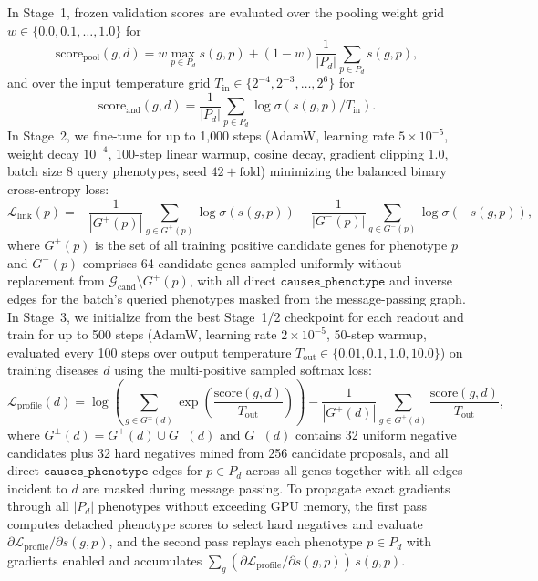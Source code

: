 \documentclass{article}
\begin{document}
In Stage~1, frozen validation scores are evaluated over the pooling weight grid
$w \in \{0.0, 0.1, \dots, 1.0\}$ for
\[
\mathrm{score}_{\mathrm{pool}}(g,d)
= w \max_{p \in P_d} s(g,p)
  + (1-w)\frac{1}{|P_d|}\sum_{p \in P_d} s(g,p),
\]
and over the input temperature grid
$T_{\mathrm{in}} \in \{2^{-4}, 2^{-3}, \dots, 2^{6}\}$ for
\[
\mathrm{score}_{\mathrm{and}}(g,d)
= \frac{1}{|P_d|}\sum_{p \in P_d}\log\sigma(s(g,p)/T_{\mathrm{in}}).
\]
In Stage~2, we fine-tune for up to 1{,}000 steps (AdamW, learning rate
$5\times 10^{-5}$, weight decay $10^{-4}$, 100-step linear warmup, cosine decay,
gradient clipping 1.0, batch size 8 query phenotypes, seed $42+\mathrm{fold}$)
minimizing the balanced binary cross-entropy loss:
\begin{equation}
  \mathcal{L}_{\mathrm{link}}(p) = -\frac{1}{|G^{+}(p)|}\sum_{g \in G^{+}(p)}\log\sigma(s(g,p))
    - \frac{1}{|G^{-}(p)|}\sum_{g \in G^{-}(p)}\log\sigma(-s(g,p)),
\end{equation}
where $G^{+}(p)$ is the set of all training positive candidate genes for
phenotype $p$ and $G^{-}(p)$ comprises 64 candidate genes sampled uniformly
without replacement from $\mathcal{G}_{\mathrm{cand}} \setminus G^{+}(p)$, with
all direct $\texttt{causes\_phenotype}$ and inverse edges for the batch's
queried phenotypes masked from the message-passing graph. In Stage~3, we
initialize from the best Stage~1/2 checkpoint for each readout and train for up
to 500 steps (AdamW, learning rate $2\times 10^{-5}$, 50-step warmup, evaluated
every 100 steps over output temperature
$T_{\mathrm{out}} \in \{0.01, 0.1, 1.0, 10.0\}$) on training diseases $d$ using
the multi-positive sampled softmax loss:
\begin{equation}
  \mathcal{L}_{\mathrm{profile}}(d) = \log\!\left(\sum_{g \in G^{\pm}(d)}
    \exp\!\left(\frac{\mathrm{score}(g,d)}{T_{\mathrm{out}}}\right)\right)
    - \frac{1}{|G^{+}(d)|}\sum_{g \in G^{+}(d)}\frac{\mathrm{score}(g,d)}{T_{\mathrm{out}}},
\end{equation}
where $G^{\pm}(d) = G^{+}(d) \cup G^{-}(d)$ and $G^{-}(d)$ contains 32 uniform negative candidates plus 32 hard negatives
mined from 256 candidate proposals, and all direct
$\texttt{causes\_phenotype}$ edges for $p \in P_d$ across all genes together
with all edges incident to $d$ are masked during message passing. To propagate
exact gradients through all $|P_d|$ phenotypes without exceeding GPU memory, the
first pass computes detached phenotype scores to select hard negatives and
evaluate $\partial \mathcal{L}_{\mathrm{profile}}/\partial s(g,p)$, and the
second pass replays each phenotype $p \in P_d$ with gradients enabled and
accumulates $\sum_{g}(\partial \mathcal{L}_{\mathrm{profile}}/\partial s(g,p))\,s(g,p)$.
\end{document}
